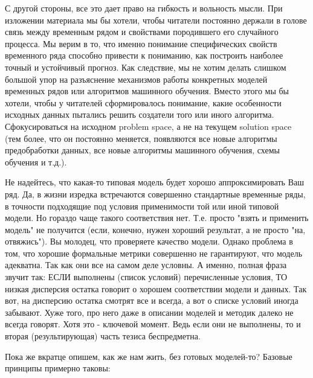 С другой стороны, все это дает право на гибкость и вольность мысли.
При изложении материала мы бы хотели, чтобы читатели постоянно
держали в голове связь между временным рядом и свойствами
породившего его случайного процесса.
Мы верим в то, что именно понимание специфических
свойств временного ряда способно привести к пониманию, как
построить наиболее точный и устойчивый прогноз. Как следствие, мы
не хотим делать слишком большой упор на разъяснение механизмов
работы конкретных моделей временных рядов или алгоритмов машинного
обучения. Вместо этого мы бы хотели, чтобы у читателей
сформировалось понимание, какие особенности исходных данных
пытались решить создатели того или иного алгоритма. Сфокусироваться
на исходном problem space, а не на текущем solution space
(тем более, что он постоянно меняется, появляются все новые алгоритмы
  предобработки данных, все новые алгоритмы машинного обучения, схемы
обучения и т.д.).

Не надейтесь, что какая-то типовая модель будет хорошо
аппроксимировать Ваш ряд. Да, в жизни изредка встречаются совершенно стандартные
временные ряды, в точности подходящие под условия применимости той
или иной типовой модели. Но гораздо чаще такого соответствия нет.
Т.е. просто "взять и применить модель" не получится (если, конечно,
нужен хороший результат, а не просто "на, отвяжись"). Вы молодец, что
проверяете качество модели. Однако проблема в том, что хорошие
формальные метрики совершенно не гарантируют, что модель адекватна.
Так как они все на самом деле условны. А именно, полная фраза звучит так:
ЕСЛИ выполнены (список условий) перечисленные условия,
ТО низкая дисперсия остатка говорит о хорошем соответствии модели и данных.
Так вот, на дисперсию остатка смотрят все и всегда, а вот о списке
условий иногда забывают. Хуже того, про него даже в описании моделей
и методик далеко не всегда говорят. Хотя это - ключевой момент. Ведь
если они не выполнены, то и вторая (результирующая) часть тезиса беспредметна.

Пока же вкратце опишем, как же нам жить,
без готовых моделей-то? Базовые принципы примерно таковы:

